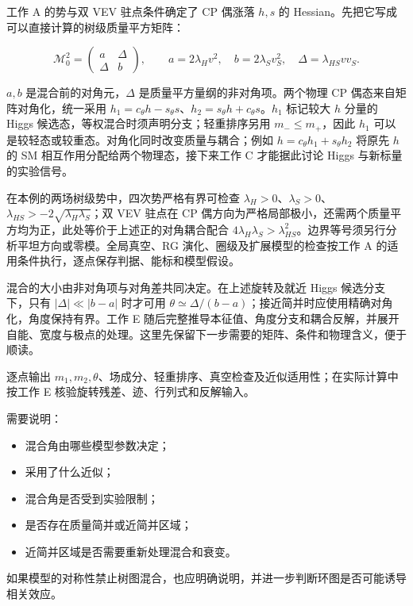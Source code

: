 \documentclass[
]{article}
\providecommand{\tightlist}{%
  \setlength{\itemsep}{0pt}\setlength{\parskip}{0pt}}
\begin{document}
工作 A 的势与双 VEV 驻点条件确定了 CP 偶涨落 \(h,s\) 的
Hessian。先把它写成可以直接计算的树级质量平方矩阵：

\[
\mathcal M_0^2=
\begin{pmatrix}a&\Delta\\\Delta&b\end{pmatrix},\qquad
a=2\lambda_Hv^2,\quad b=2\lambda_Sv_S^2,\quad
\Delta=\lambda_{HS}vv_S.
\]

\(a,b\) 是混合前的对角元，\(\Delta\) 是质量平方量纲的非对角项。两个物理
CP 偶态来自矩阵对角化，统一采用
\(h_1=c_\theta h-s_\theta s\)、\(h_2=s_\theta h+c_\theta s\)。\(h_1\)
标记较大 \(h\) 分量的 Higgs 候选态，等权混合时须声明分支；轻重排序另用
\(m_-\le m_+\)，因此 \(h_1\)
可以是较轻态或较重态。对角化同时改变质量与耦合；例如
\(h=c_\theta h_1+s_\theta h_2\) 将原先 \(h\) 的 SM
相互作用分配给两个物理态，接下来工作 C 才能据此讨论 Higgs
与新标量的实验信号。

在本例的两场树级势中，四次势严格有界可检查
\(\lambda_H>0\)、\(\lambda_S>0\)、\(\lambda_{HS}>-2\sqrt{\lambda_H\lambda_S}\)；双
VEV 驻点在 CP
偶方向为严格局部极小，还需两个质量平方均为正，此处等价于上述正的对角耦合配合
\(4\lambda_H\lambda_S>\lambda_{HS}^2\)。边界等号须另行分析平坦方向或零模。全局真空、RG
演化、圈级及扩展模型的检查按工作 A
的适用条件执行，逐点保存判据、能标和模型假设。

混合的大小由非对角项与对角差共同决定。在上述旋转及就近 Higgs
候选分支下，只有 \(|\Delta|\ll|b-a|\) 时才可用
\(\theta\simeq\Delta/(b-a)\)；接近简并时应使用精确对角化，角度保持有界。工作
E
随后完整推导本征值、角度分支和耦合反解，并展开自能、宽度与极点的处理。这里先保留下一步需要的矩阵、条件和物理含义，便于顺读。

逐点输出
\(m_1,m_2,\theta\)、场成分、轻重排序、真空检查及近似适用性；在实际计算中按工作
E 核验旋转残差、迹、行列式和反解输入。

需要说明：

\begin{itemize}
\tightlist
\item
  混合角由哪些模型参数决定；
\item
  采用了什么近似；
\item
  混合角是否受到实验限制；
\item
  是否存在质量简并或近简并区域；
\item
  近简并区域是否需要重新处理混合和衰变。
\end{itemize}

如果模型的对称性禁止树图混合，也应明确说明，并进一步判断环图是否可能诱导相关效应。
\end{document}
